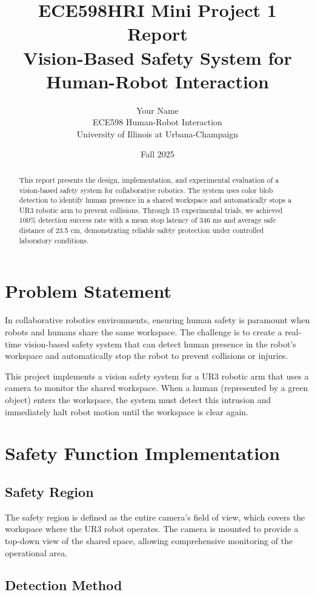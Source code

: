 \documentclass[11pt,letterpaper]{article}
\title{\textbf{ECE598HRI Mini Project 1 Report} \\ Vision-Based Safety System for Human-Robot Interaction}
\author{Your Name \\ ECE598 Human-Robot Interaction \\ University of Illinois at Urbana-Champaign}
\date{Fall 2025}
\begin{document}
\maketitle

\begin{abstract}
This report presents the design, implementation, and experimental evaluation of a vision-based safety system for collaborative robotics. The system uses color blob detection to identify human presence in a shared workspace and automatically stops a UR3 robotic arm to prevent collisions. Through 15 experimental trials, we achieved 100\% detection success rate with a mean stop latency of 346 ms and average safe distance of 23.5 cm, demonstrating reliable safety protection under controlled laboratory conditions.
\end{abstract}

\section{Problem Statement}

In collaborative robotics environments, ensuring human safety is paramount when robots and humans share the same workspace. The challenge is to create a real-time vision-based safety system that can detect human presence in the robot's workspace and automatically stop the robot to prevent collisions or injuries.

This project implements a vision safety system for a UR3 robotic arm that uses a camera to monitor the shared workspace. When a human (represented by a green object) enters the workspace, the system must detect this intrusion and immediately halt robot motion until the workspace is clear again.

\section{Safety Function Implementation}

\subsection{Safety Region}

The safety region is defined as the entire camera's field of view, which covers the workspace where the UR3 robot operates. The camera is mounted to provide a top-down view of the shared space, allowing comprehensive monitoring of the operational area.

\subsection{Detection Method}
\end{document}
